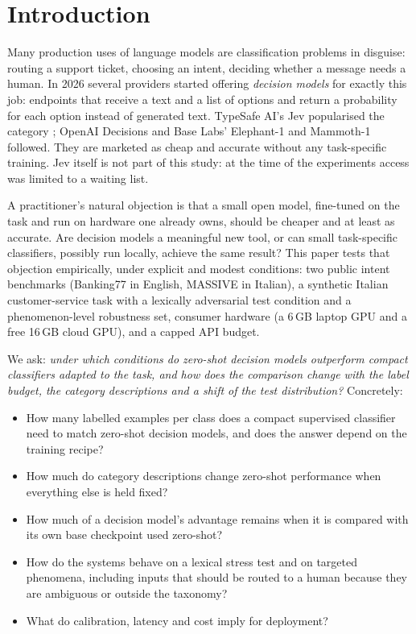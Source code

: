 \section{Introduction}

Many production uses of language models are classification problems in disguise: routing a support ticket, choosing an
intent, deciding whether a message needs a human. In 2026 several providers started offering \emph{decision models}
for exactly this job: endpoints that receive a text and a list of options and return a probability for each option
instead of generated text. TypeSafe AI's Jev popularised the category \citep{venturebeat2026jev}; OpenAI Decisions
\citep{openai2026decisions} and Base Labs' Elephant-1 and Mammoth-1 \citep{baselabs2026decision} followed. They are
marketed as cheap and accurate without any task-specific training. Jev itself is not part of this study: at the time of
the experiments access was limited to a waiting list.

A practitioner's natural objection is that a small open model, fine-tuned on the task and run on hardware one already
owns, should be cheaper and at least as accurate. Are decision models a meaningful new tool, or can small task-specific
classifiers, possibly run locally, achieve the same result? This paper tests that objection empirically, under explicit and
modest conditions: two public intent benchmarks (Banking77 in English, MASSIVE in Italian), a synthetic Italian
customer-service task with a lexically adversarial test condition and a phenomenon-level robustness set, consumer
hardware (a 6\,GB laptop GPU and a free 16\,GB cloud GPU), and a capped API budget.

We ask: \emph{under which conditions do zero-shot decision models outperform compact classifiers adapted to the task,
and how does the comparison change with the label budget, the category descriptions and a shift of the test
distribution?} Concretely:
\begin{itemize}
  \item[RQ1] How many labelled examples per class does a compact supervised classifier need to match zero-shot decision models,
  and does the answer depend on the training recipe?
  \item[RQ2] How much do category descriptions change zero-shot performance when everything else is held fixed?
  \item[RQ3] How much of a decision model's advantage remains when it is compared with its own base checkpoint used zero-shot?
  \item[RQ4] How do the systems behave on a lexical stress test and on targeted phenomena, including inputs that should be
  routed to a human because they are ambiguous or outside the taxonomy?
  \item[RQ5] What do calibration, latency and cost imply for deployment?
\end{itemize}

